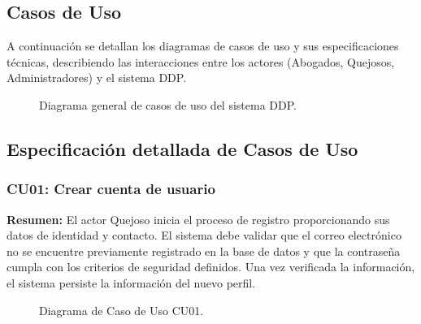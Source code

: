 
\begin{appendices}

\chapter{Casos de Uso}
\label{anexo:casos_uso}

A continuación se detallan los diagramas de casos de uso y sus especificaciones técnicas, describiendo las interacciones entre los actores (Abogados, Quejosos, Administradores) y el sistema DDP.

\begin{figure}[htbp]
    \centering
    \caption{Diagrama general de casos de uso del sistema DDP.}
    \label{fig:casos_uso_general}
\end{figure}

\section{Especificación detallada de Casos de Uso}

\subsection{CU01: Crear cuenta de usuario}

\textbf{Resumen:} 
El actor Quejoso inicia el proceso de registro proporcionando sus datos de identidad y contacto. El sistema debe validar que el correo electrónico no se encuentre previamente registrado en la base de datos y que la contraseña cumpla con los criterios de seguridad definidos. Una vez verificada la información, el sistema persiste la información del nuevo perfil.

\begin{figure}[htbp]
    \centering
    \figCUuno 
    \caption{Diagrama de Caso de Uso CU01.}
    \label{fig:cu01}
\end{figure}


\end{appendices}
